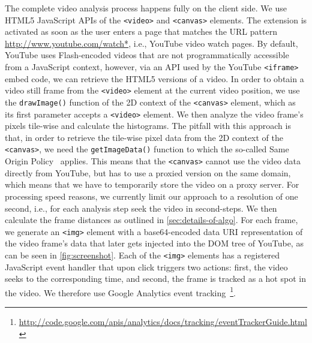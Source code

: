 \documentclass{acm_proc_article-sp}
\newcommand{\inlinelistingsize}{\fontsize{8pt}{11pt}}
\let\oldurl\url
\renewcommand{\url}[1]{\inlinelistingsize\oldurl{#1}}
\begin{document}

The complete video analysis process happens fully on the client side. We use HTML5 JavaScript APIs of the \texttt{<video>} and \texttt{<canvas>} elements. The extension is activated as soon as the user enters a page that matches the URL pattern \url{http://www.youtube.com/watch*}, i.e., YouTube video watch pages. By default, YouTube uses Flash-encoded videos that are not programmatically accessible from a JavaScript context, however, via an API used by the YouTube \texttt{<iframe>} embed code, we can retrieve the HTML5 versions of a video. In order to obtain a video still frame from the \texttt{<video>} element at the current video position, we use the \texttt{drawImage()} function of the 2D context of the \texttt{<canvas>} element, which as its first parameter accepts a \texttt{<video>} element. We then analyze the video frame's pixels tile-wise and calculate the histograms. The pitfall with this approach is that, in order to retrieve the tile-wise pixel data from the 2D context of the \texttt{<canvas>}, we need the \texttt{getImageData()} function to which the so-called Same Origin Policy~\cite{sameoriginpolicy} applies. This means that the \texttt{<canvas>} cannot use the video data directly  from YouTube, but has to use a proxied version on the same domain, which means that we have to temporarily store the video on a proxy server. For processing speed reasons, we currently limit our approach to a resolution of one second, i.e., for each analysis step seek the video in second-steps. We then calculate the frame distances as outlined in \autoref{sec:details-of-algo}. For each frame, we generate an \texttt{<img>} element with a base64-encoded data URI representation of the video frame's data that later gets injected into the DOM tree of YouTube, as can be seen in \autoref{fig:screenshot}. Each of the \texttt{<img>} elements has a registered JavaScript event handler that upon click triggers two actions: first, the video seeks to the corresponding time, and second, the frame is tracked as a hot spot in the video. We therefore use Google Analytics event tracking~\footnote{\url{http://code.google.com/apis/analytics/docs/tracking/eventTrackerGuide.html}}.
\end{document}
